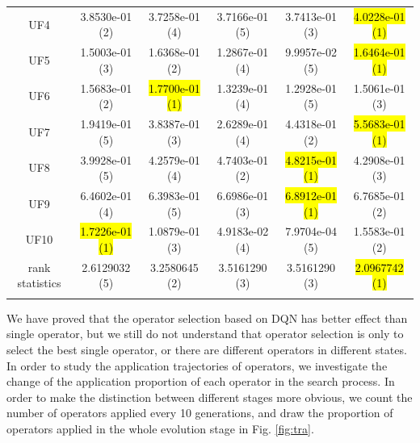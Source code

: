 \documentclass[journal]{IEEEtran}
\begin{document}
\begin{table}[tbp]
\begin{tabular}{cccccc}
    UF4             & 3.8530e-01 (2)      & 3.7258e-01 (4)      & 3.7166e-01 (5)    & 3.7413e-01 (3)      & \hl{4.0228e-01 (1)} \\
    UF5             & 1.5003e-01 (3)      & 1.6368e-01 (2)      & 1.2867e-01 (4)    & 9.9957e-02 (5)      & \hl{1.6464e-01 (1)} \\
    UF6             & 1.5683e-01 (2)      & \hl{1.7700e-01 (1)} & 1.3239e-01 (4)    & 1.2928e-01 (5)      & 1.5061e-01 (3)      \\
    UF7             & 1.9419e-01 (5)      & 3.8387e-01 (3)      & 2.6289e-01 (4)    & 4.4318e-01 (2)      & \hl{5.5683e-01 (1)} \\
    UF8             & 3.9928e-01 (5)      & 4.2579e-01 (4)      & 4.7403e-01 (2)    & \hl{4.8215e-01 (1)} & 4.2908e-01 (3)      \\
    UF9             & 6.4602e-01 (4)      & 6.3983e-01 (5)      & 6.6986e-01 (3)    & \hl{6.8912e-01 (1)} & 6.7685e-01 (2)      \\
    UF10            & \hl{1.7226e-01 (1)} & 1.0879e-01 (3)      & 4.9183e-02 (4)    & 7.9704e-04 (5)      & 1.5583e-01 (2)      \\
    \hline
    rank statistics & 2.6129032 (5)       & 3.2580645 (2)       & 3.5161290 (3)     & 3.5161290 (3)       & \hl{2.0967742 (1)}  \\
    \bottomrule
    \label{tab:hv_ops}
  \end{tabular}
\end{table}

We have proved that the operator selection based on DQN has better effect than single operator, but we still do not understand that operator selection is only to select the best single operator, or there are different operators in different states. In order to study the application trajectories of operators, we investigate the change of the application proportion of each operator in the search process.
In order to make the distinction between different stages more obvious, we count the number of operators applied every 10 generations, and draw the proportion of operators applied in the whole evolution stage in Fig. \ref{fig:tra}.
\end{document}

